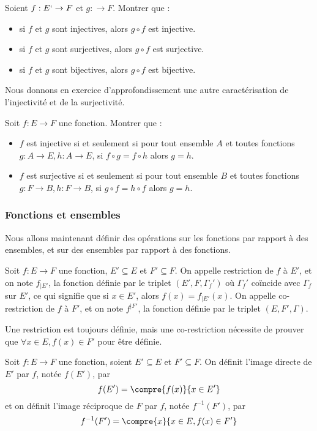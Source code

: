 \begin{exo}
    Soient $f : E `\to F$ et $g : \to F$. Montrer que :
    \begin{itemize}
        \item si $f$ et $g$ sont injectives, alors $g\circ f$ est injective.
        \item si $f$ et $g$ sont surjectives, alors $g\circ f$ est surjective.
        \item si $f$ et $g$ sont bijectives, alors $g\circ f$ est bijective.
    \end{itemize}
\end{exo}

Nous donnons en exercice d'approfondissement une autre caractérisation de l'injectivité et de la surjectivité.

\begin{exo}[$\boldsymbol{*}$]
    Soit $f : E \to F$ une fonction. Montrer que :
    \begin{itemize}
        \item $f$ est injective si et seulement si pour tout ensemble $A$ et toutes fonctions $g : A \to E, h : A \to E$, si $f\circ g = f \circ h$ alors $g=h$.
        \item $f$ est surjective si et seulement si pour tout ensemble $B$ et toutes fonctions $g : F \to B, h : F \to B$, si $g\circ f = h \circ f$ alors $g=h$.
    \end{itemize}
\end{exo}

\subsubsection{Fonctions et ensembles}

Nous allons maintenant définir des opérations sur les fonctions par rapport à des ensembles, et sur des ensembles par rapport à des fonctions.

\begin{defi}
    Soit $f : E \to F$ une fonction, $E'\subseteq E$ et $F'\subseteq F$. On appelle restriction de $f$ à $E'$, et on note $f_{|E'}$, la fonction définie par le triplet $(E',F,\Gamma_f')$ où $\Gamma_f'$ coïncide avec $\Gamma_f$ sur $E'$, ce qui signifie que si $x\in E'$, alors $f(x)=f_{|E'}(x)$. On appelle co-restriction de $f$ à $F'$, et on note $f^{|F'}$, la fonction définie par le triplet $(E,F',\Gamma)$. 
    
    Une restriction est toujours définie, mais une co-restriction nécessite de prouver que $\forall x \in E, f(x)\in F'$ pour être définie.
\end{defi}

\begin{defi}
    Soit $f : E \to F$ une fonction, soient $E'\subseteq E$ et $F'\subseteq F$. On définit l'image directe de $E'$ par $f$, notée $f(E')$, par $$f(E')=\compre{f(x)}{x\in E'}$$ et on définit l'image réciproque de $F$ par $f$, notée $f^{-1}(F')$, par $$f^{-1}(F')=\compre{x}{x\in E, f(x)\in F'}$$
\end{defi}

\newpage
